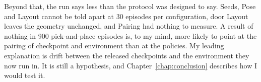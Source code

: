 Beyond that, the run says less than the protocol was designed to say. Seeds, Pose and Layout cannot be told apart at 30 episodes per configuration, door Layout leaves the geometry unchanged, and Pairing had nothing to measure. A result of nothing in 900 pick-and-place episodes is, to my mind, more likely to point at the pairing of checkpoint and environment than at the policies. My leading explanation is drift between the released checkpoints and the environment they now run in. It is still a hypothesis, and Chapter~\ref{chap:conclusion} describes how I would test it.

\endgroup
